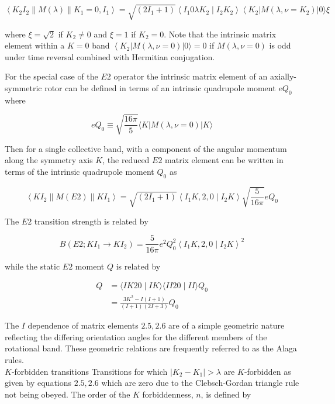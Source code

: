 \documentclass[10pt]{article}
\begin{document}
\begin{equation*}
\left\langle K_{2} I_{2}\|M(\lambda)\| K_{1}=0, I_{1}\right\rangle=\sqrt{\left(2 I_{1}+1\right)}\left\langle I_{1} 0 \lambda K_{2} \mid I_{2} K_{2}\right\rangle\left\langle K_{2}\right| M\left(\lambda, \nu=K_{2}\right)|0\rangle \xi \tag{2.6}
\end{equation*}


where $\xi=\sqrt{2}$ if $K_{2} \neq 0$ and $\xi=1$ if $K_{2}=0$. Note that the intrinsic matrix element within a $K=0$ band $\left\langle K_{2}\right| M(\lambda, \nu=0)|0\rangle=0$ if $M(\lambda, \nu=0)$ is odd under time reversal combined with Hermitian conjugation.

For the special case of the $E 2$ operator the intrinsic matrix element of an axially-symmetric rotor can be defined in terms of an intrinsic quadrupole moment $e Q_{0}$ where


\begin{equation*}
e Q_{0} \equiv \sqrt{\frac{16 \pi}{5}}\langle K| M(\lambda, \nu=0)|K\rangle \tag{2.7}
\end{equation*}


Then for a single collective band, with a component of the angular momentum along the symmetry axis $K$, the reduced $E 2$ matrix element can be written in terms of the intrinsic quadrupole moment $Q_{0}$ as


\begin{equation*}
\left\langle K I_{2}\|M(E 2)\| K I_{1}\right\rangle=\sqrt{\left(2 I_{1}+1\right)}\left\langle I_{1} K, 2,0 \mid I_{2} K\right\rangle \sqrt{\frac{5}{16 \pi}} e Q_{0} \tag{2.8}
\end{equation*}


The $E 2$ transition strength is related by


\begin{equation*}
B\left(E 2 ; K I_{1} \rightarrow K I_{2}\right)=\frac{5}{16 \pi} e^{2} Q_{0}^{2}\left\langle I_{1} K, 2,0 \mid I_{2} K\right\rangle^{2} \tag{2.9}
\end{equation*}


while the static $E 2$ moment $Q$ is related by


\begin{align*}
Q & =\langle I K 20 \mid I K\rangle\langle I I 20 \mid I I\rangle Q_{0}  \tag{2.10}\\
& =\frac{3 K^{2}-I(I+1)}{(I+1)(2 I+3)} Q_{0}
\end{align*}


The $I$ dependence of matrix elements $2.5,2.6$ are of a simple geometric nature reflecting the differing orientation angles for the different members of the rotational band. These geometric relations are frequently referred to as the Alaga rules.\\
$K$-forbidden transitions Transitions for which $\left|K_{2}-K_{1}\right|>\lambda$ are $K$-forbidden as given by equations $2.5,2.6$ which are zero due to the Clebsch-Gordan triangle rule not being obeyed. The order of the $K$ forbiddenness, $n$, is defined by
\end{document}
